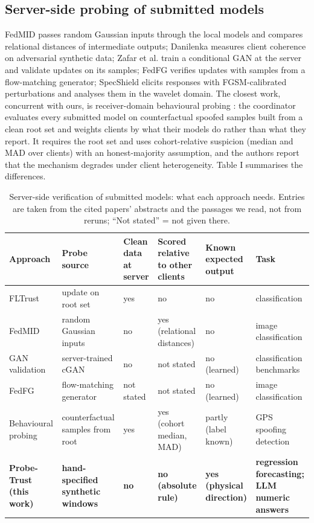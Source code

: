\documentclass[journal]{IEEEtran}
\begin{document}
\subsection{Server-side probing of submitted models}
FedMID \cite{fedmid} passes random Gaussian inputs through the local models and compares relational distances of intermediate outputs; Danilenka \cite{danilenka} measures client coherence on adversarial synthetic data; Zafar et al. \cite{zafar} train a conditional GAN at the server and validate updates on its samples; FedFG \cite{fedfg} verifies updates with samples from a flow-matching generator; SpecShield \cite{specshield} elicits responses with FGSM-calibrated perturbations and analyses them in the wavelet domain. The closest work, concurrent with ours, is receiver-domain behavioural probing \cite{uav}: the coordinator evaluates every submitted model on counterfactual spoofed samples built from a clean root set and weights clients by what their models do rather than what they report. It requires the root set and uses cohort-relative suspicion (median and MAD over clients) with an honest-majority assumption, and the authors report that the mechanism degrades under client heterogeneity. Table I summarises the differences.

\begin{table}[!t]
\caption{Server-side verification of submitted models: what each approach needs. Entries are taken from the cited papers' abstracts and the passages we read, not from reruns; ``Not stated'' = not given there.}
\centering
\footnotesize
\renewcommand{\arraystretch}{1.12}
\begin{tabular}{|>{\raggedright\arraybackslash}p{2.93cm}|>{\raggedright\arraybackslash}p{3.11cm}|>{\raggedright\arraybackslash}p{2.09cm}|>{\raggedright\arraybackslash}p{2.55cm}|>{\raggedright\arraybackslash}p{2.27cm}|>{\raggedright\arraybackslash}p{2.55cm}|}
\hline
\textbf{Approach} & \textbf{Probe source} & \textbf{Clean data at server} & \textbf{Scored relative to other clients} & \textbf{Known expected output} & \textbf{Task} \\
\hline
FLTrust \cite{fltrust} & update on root set & yes & no & no & classification \\
\hline
FedMID \cite{fedmid} & random Gaussian inputs & no & yes (relational distances) & no & image classification \\
\hline
GAN validation \cite{zafar} & server-trained cGAN & no & not stated & no (learned) & classification benchmarks \\
\hline
FedFG \cite{fedfg} & flow-matching generator & not stated & not stated & no (learned) & image classification \\
\hline
Behavioural probing \cite{uav} & counterfactual samples from root & yes & yes (cohort median, MAD) & partly (label known) & GPS spoofing detection \\
\hline
\textbf{Probe-Trust (this work)} & \textbf{hand-specified synthetic windows} & \textbf{no} & \textbf{no (absolute rule)} & \textbf{yes (physical direction)} & \textbf{regression forecasting; LLM numeric answers} \\
\hline
\end{tabular}
\end{table}
\end{document}
